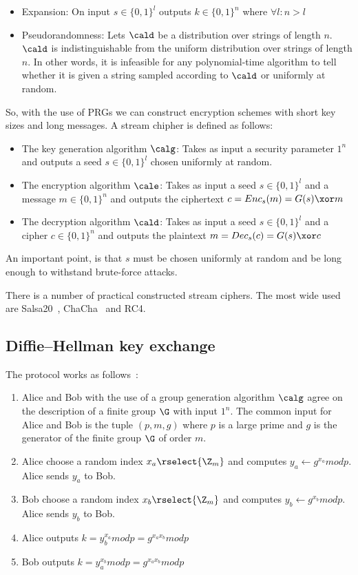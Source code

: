 \begin{itemize}
  \item Expansion: On input $s \in \{0, 1\}^{l}$ outputs $k \in \{0, 1\}^{n}$ where $\forall l: n > l$
  \item Pseudorandomness: Lets $\cald$ be a distribution over strings of length $n$. $\cald$ is indistinguishable from the uniform distribution over strings of length $n$. In other words, it is infeasible for any polynomial-time algorithm to tell whether it is given a string sampled according to $\cald$ or uniformly at random.
\end{itemize}

So, with the use of PRGs we can construct encryption schemes with short key sizes and long messages. A stream chipher is defined as follows:

\begin{itemize}
  \item The key generation algorithm $\calg$: Takes as input a security parameter $1^{n}$ and outputs a seed $s \in \{0, 1\}^{l}$ chosen uniformly at random.
  \item The encryption algorithm $\cale$: Takes as input a seed $s \in \{0, 1\}^{l}$ and a message $m \in \{0, 1\}^{n}$ and outputs the ciphertext $c = Enc_s(m) = G(s) \xor m$
  \item The decryption algorithm $\cald$: Takes as input a seed $s \in \{0, 1\}^{l}$ and a cipher $c \in \{0, 1\}^{n}$ and outputs the plaintext $m = Dec_s(c) = G(s) \xor c$
\end{itemize}

An important point, is that $s$ must be chosen uniformly at random and be long enough to withstand brute-force attacks.

There is a number of practical constructed stream ciphers. The most wide used are Salsa20~\cite{Salsa20}, ChaCha~\cite{chacha} and RC4.

\subsection{Diffie–Hellman key exchange}
\label{preliminaries:pub:dh}

The protocol works as follows~\cite{Katz:2014:IMC:2700550, kiagias:crypto}:

\begin{enumerate}
  \item Alice and Bob  with the use of a group generation algorithm $\calg$ agree on the description of a finite group $\G$ with input $1^{n}$. The common input for Alice and Bob is the tuple $(p, m, g)$ where $p$ is a large prime and $g$ is the generator of the finite group $\G$ of order $m$.
  \item Alice choose a random index $x_a \rselect{\Z_m}$ and computes $y_a \leftarrow{g^{x_a}}modp$. Alice sends $y_a$ to Bob.
  \item Bob choose a random index $x_b \rselect{\Z_m}$ and computes $y_b \leftarrow{g^{x_b}}modp$. Alice sends $y_b$ to Bob.
  \item Alice outputs $k = y_b^{x_a}modp = g^{{x_a}{x_b}}modp$
  \item Bob outputs $k = y_a^{x_b}modp = g^{{x_a}{x_b}}modp$
\end{enumerate}

